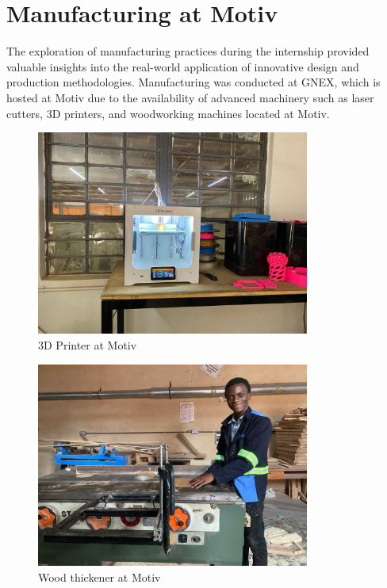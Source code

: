 \section{Manufacturing at Motiv}

The exploration of manufacturing practices during the internship provided valuable insights into the real-world application of innovative design and production methodologies. Manufacturing was conducted at GNEX, which is hosted at Motiv due to the availability of advanced machinery such as laser cutters, 3D printers, and woodworking machines located at Motiv.

\begin{figure}[H]
    \centering
    \includegraphics[width=0.8\textwidth]{images/3d-printer.jpeg}
    \caption{3D Printer at Motiv}
    \label{fig:3D Printer at Motiv}
\end{figure}


\begin{figure}[H]
    \centering
    \includegraphics[width=0.8\textwidth]{images/woodPlaner.jpeg}
    \caption{Wood thickener at Motiv}
    \label{fig: Wood thickener at Motiv}
\end{figure}

